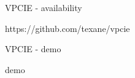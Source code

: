 \documentclass{beamer}
\begin{document}
\begin{frame}{VPCIE - availability}
  \begin{center}https://github.com/texane/vpcie\end{center}
\end{frame}

\begin{frame}{VPCIE - demo}
  \begin{center}demo\end{center}
\end{frame}
\end{document}
